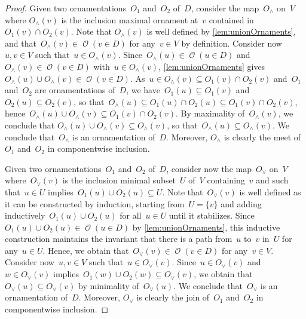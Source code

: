 \documentclass{amsart}
\theoremstyle{definition}
\renewcommand{\c}[1]{\mathcal{#1}} %
\newcommand{\set}[2]{\left\{ #1 \;\middle|\; #2 \right\}} %
\newcommand{\meet}{\wedge} %
\newcommand{\join}{\vee} %
\DeclareMathOperator{\Orn}{\c{O}}  %
\begin{document}
\begin{proof}
%
Given two ornamentations~$O_1$ and~$O_2$ of~$D$, consider the map~$O_\meet$ on~$V$ where $O_\meet(v)$ is the inclusion maximal ornament at~$v$ contained in~$O_1(v) \cap O_2(v)$.
Note that $O_\meet(v)$ is well defined by \cref{lem:unionOrnaments}, and that~$O_\meet(v) \in \Orn(v \in D)$ for any~$v \in V$ by definition.
Consider now~$u,v \in V$ such that~$u \in O_\meet(v)$.
Since~$O_\meet(u) \in \Orn(u \in D)$ and~$O_\meet(v) \in \Orn(v \in D)$ with~${u \in O_\meet(v)}$, \cref{lem:unionOrnaments} gives~$O_\meet(u) \cup O_\meet(v) \in \Orn(v \in D)$.
As~$u \in O_\meet(v) \subseteq O_1(v) \cap O_2(v)$ and~$O_1$ and~$O_2$ are ornamentations of~$D$, we have~$O_1(u) \subseteq O_1(v)$ and~$O_2(u) \subseteq O_2(v)$, so that~${O_\meet(u) \subseteq O_1(u) \cap O_2(u) \subseteq O_1(v) \cap O_2(v)}$, hence~$O_\meet(u) \cup O_\meet(v) \subseteq O_1(v) \cap O_2(v)$.
By maximality of~$O_\meet(v)$, we conclude that ${O_\meet(u) \cup O_\meet(v) \subseteq O_\meet(v)}$, so that~$O_\meet(u) \subseteq O_\meet(v)$.
We conclude that~$O_\meet$ is an ornamentation of~$D$.
Moreover, $O_\meet$ is clearly the meet of~$O_1$ and~$O_2$ in componentwise inclusion.

Given two ornamentations~$O_1$ and~$O_2$ of~$D$, consider now the map~$O_\join$ on~$V$ where~$O_\join(v)$ is the inclusion minimal subset~$U$ of~$V$ containing~$v$ and such that~$u \in U$ implies~$O_1(u) \cup O_2(u) \subseteq U$.
Note that~$O_\join(v)$ is well defined as it can be constructed by induction, starting from~$U = \{v\}$ and adding inductively~$O_1(u) \cup O_2(u)$ for all~$u \in U$ until it stabilizes.
Since~$O_1(u) \cup O_2(u) \in \Orn(u \in D)$ by \cref{lem:unionOrnaments}, this inductive construction maintains the invariant that there is a path from~$u$ to~$v$ in~$U$ for any~$u \in U$.
Hence, we obtain that~$O_\join(v) \in \Orn(v \in D)$ for any~$v \in V$.
Consider now~$u,v \in V$ such that~$u \in O_\join(v)$.
Since~$u \in O_\join(v)$ and~$w \in O_\join(v)$ implies~$O_1(w) \cup O_2(w) \subseteq O_\join(v)$, we obtain that~$O_\join(u) \subseteq O_\join(v)$ by minimality of~$O_\join(u)$.
We conclude that~$O_\join$ is an ornamentation of~$D$.
Moreover, $O_\join$ is clearly the join of~$O_1$ and~$O_2$ in componentwise inclusion.
\end{proof}
\end{document}
